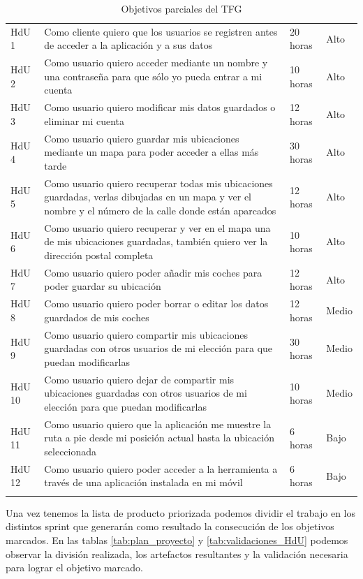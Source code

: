 \begin{longtable}{p{2cm} p{6cm} p{4cm} p{3cm}}
		\rowcolor{gray!25}
		HdU 1	&	Como cliente quiero que los usuarios se registren antes de acceder a la aplicación y a sus datos	
				&	20 horas		&	Alto	\\
		HdU 2	&	Como usuario quiero acceder mediante un nombre y una contraseña para que sólo yo pueda entrar a mi cuenta							&	10 horas	&	Alto	\\
		\rowcolor{gray!25}
		HdU 3	&	Como usuario quiero modificar mis datos guardados	o eliminar mi cuenta												
				&	12 horas	&	Alto	\\ 
		HdU 4	& 	Como usuario quiero guardar mis ubicaciones mediante un mapa para poder acceder a ellas más tarde	
				&	30 horas	&	Alto	\\
		\rowcolor{gray!25}
		HdU 5	&	Como usuario quiero recuperar todas mis ubicaciones guardadas, verlas dibujadas en un mapa y ver el nombre y el número de la calle donde están aparcados
				&	12 horas	&	Alto	\\
		HdU 6	&	Como usuario quiero recuperar y ver en el mapa una de mis ubicaciones guardadas, también quiero ver la dirección postal completa
				&	10 horas	&	Alto	\\
		\rowcolor{gray!25}
		HdU 7	&	Como usuario quiero poder añadir mis coches para poder guardar su ubicación															&	12 horas	&	Alto	\\
		HdU 8	&	Como usuario quiero poder borrar o editar los datos guardados de mis coches
				&	12 horas	&	Medio	\\	
		\rowcolor{gray!25}
		HdU 9	&	Como usuario quiero compartir mis ubicaciones guardadas con otros usuarios de mi elección para que puedan modificarlas			
				&	30 horas&	Medio	\\
		HdU 10	&	Como usuario quiero dejar de compartir mis ubicaciones guardadas con otros usuarios de mi elección para que puedan modificarlas			
				&	10 horas&	Medio	\\
		\rowcolor{gray!25}
		HdU 11	&	Como usuario quiero que la aplicación me muestre la ruta a pie desde mi posición actual hasta la ubicación seleccionada
				&	6 horas	&	Bajo	\\
		HdU 12	&	Como usuario quiero poder acceder a la herramienta a través de una aplicación instalada en mi móvil
				&	6 horas	&	Bajo	\\
	    \hline
	  \caption{Objetivos parciales del \ac{TFG}}
	  \label{tab:historia_usuario}
	\end{longtable}

Una vez tenemos la lista de producto priorizada podemos dividir el trabajo en los distintos sprint que generarán como resultado la consecución de los objetivos marcados. En las tablas \ref{tab:plan_proyecto} y \ref{tab:validaciones_HdU} podemos observar la división realizada, los artefactos resultantes y la validación necesaria para lograr el objetivo marcado.

